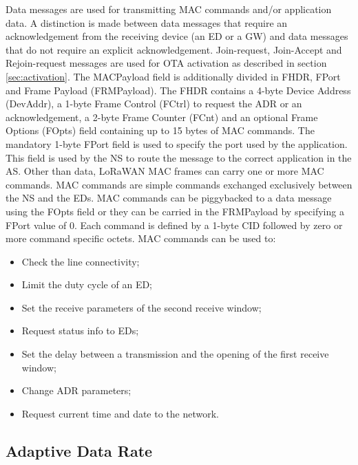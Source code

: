 Data messages are used for transmitting MAC commands and/or application data. A distinction is made between data messages that require an acknowledgement from the receiving device (an \gls{ED} or a \gls{GW}) and data messages that do not require an explicit acknowledgement. Join-request, Join-Accept and Rejoin-request messages are used for \gls{OTA} activation as described in section \ref{sec:activation}.  
The MACPayload field is additionally divided in \gls{FHDR}, \gls{FPort} and Frame Payload (FRMPayload). The \gls{FHDR} contains a 4-byte Device Address (DevAddr), a 1-byte Frame Control (FCtrl) to request the \gls{ADR} or an acknowledgement, a 2-byte Frame Counter (FCnt) and an optional Frame Options (FOpts) field containing up to 15 bytes of MAC commands. The mandatory 1-byte \gls{FPort} field is used to specify the port used by the application. This field is used by the \gls{NS} to route the message to the correct application in the \gls{AS}.
Other than data, LoRaWAN MAC frames can carry one or more MAC commands.  
MAC commands are simple commands exchanged exclusively between the \gls{NS} and the \glspl{ED}. MAC commands can be piggybacked to a data message using the FOpts field or they can be carried in the FRMPayload by specifying a FPort value of 0. Each command is defined by a 1-byte \gls{CID} followed by zero or more command specific octets.
MAC commands can be used to:

\begin{itemize}
 
    \item Check the line connectivity;
    \item Limit the duty cycle of an \gls{ED};
    \item Set the receive parameters of the second receive window;
    \item Request status info to \glspl{ED};
    \item Set the delay between a transmission and the opening of the first receive window;
    \item Change \gls{ADR} parameters;
    \item Request current time and date to the network.

\end{itemize}

\subsection{Adaptive Data Rate}

